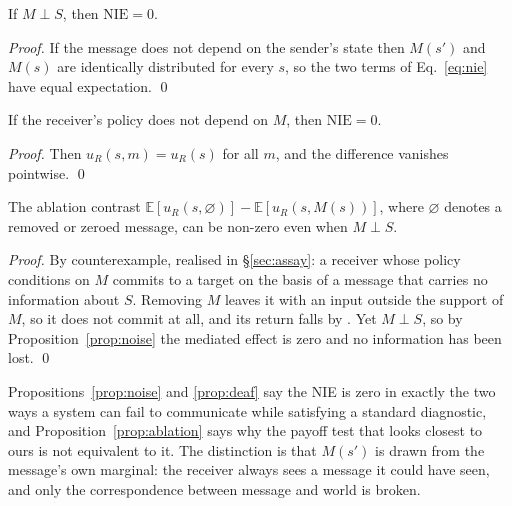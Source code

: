 \begin{proposition}
\label{prop:noise}
If $M \perp S$, then $\mathrm{NIE} = 0$.
\end{proposition}
\begin{proof}
If the message does not depend on the sender's state then $M(s')$ and $M(s)$ are
identically distributed for every $s$, so the two terms of Eq.~\ref{eq:nie} have
equal expectation. \qed
\end{proof}

\begin{proposition}
\label{prop:deaf}
If the receiver's policy does not depend on $M$, then $\mathrm{NIE} = 0$.
\end{proposition}
\begin{proof}
Then $u_R(s, m) = u_R(s)$ for all $m$, and the difference vanishes pointwise. \qed
\end{proof}

\begin{proposition}
\label{prop:ablation}
The ablation contrast $\mathbb{E}[u_R(s, \varnothing)] - \mathbb{E}[u_R(s, M(s))]$,
where $\varnothing$ denotes a removed or zeroed message, can be non-zero even when
$M \perp S$.
\end{proposition}
\begin{proof}
By counterexample, realised in \S\ref{sec:assay}: a receiver whose policy
conditions on $M$ commits to a target on the basis of a message that carries no
information about $S$. Removing $M$ leaves it with an input outside the support of
$M$, so it does not commit at all, and its return falls by \KillNoise. Yet
$M \perp S$, so by Proposition~\ref{prop:noise} the mediated effect is zero and no
information has been lost. \qed
\end{proof}

Propositions~\ref{prop:noise} and \ref{prop:deaf} say the NIE is zero in exactly
the two ways a system can fail to communicate while satisfying a standard
diagnostic, and Proposition~\ref{prop:ablation} says why the payoff test that
looks closest to ours is not equivalent to it. The distinction is that
$M(s')$ is drawn from the message's own marginal: the receiver always sees a
message it could have seen, and only the correspondence between message and world
is broken.

